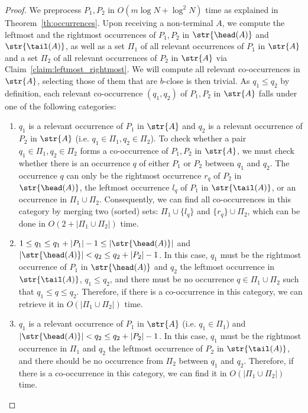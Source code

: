 \computingrelevant*
\begin{proof}
We preprocess $P_1, P_2$ in $O(m \log N + \log^2 N)$ time as explained in Theorem~\ref{th:occurrences}. Upon receiving a non-terminal $A$, we compute the leftmost and the rightmost occurrences of $P_1, P_2$ in $\str{\head(A)}$ and $\str{\tail(A)}$, as well as a set $\Pi_1$ of all relevant occurrences of $P_1$ in $\str{A}$ and a set $\Pi_2$ of all relevant occurrences of $P_2$ in $\str{A}$ via Claim~\ref{claim:leftmost_rightmost}.
We will compute all relevant co-occurrences in $\str{A}$, selecting those of them that are $b$-close is then trivial. 
As $q_1 \le q_2$ by definition, each relevant co-occurrence $(q_1,q_2)$ of $P_1,P_2$ in $\str{A}$ falls under one of the following categories:

\begin{enumerate}
\item $q_1$ is a relevant occurrence of $P_1$ in $\str{A}$ and $q_2$ is a relevant occurrence of $P_2$ in $\str{A}$ (i.e. $q_1 \in \Pi_1, q_2 \in \Pi_2$). To check whether a pair $q_1 \in \Pi_1, q_2 \in \Pi_2$ forms a co-occurrence of $P_1, P_2$ in $\str{A}$, we must check whether there is an occurrence $q$ of either $P_1$ or $P_2$ between $q_1$ and $q_2$. The occurrence $q$ can only be the rightmost occurrence $r_q$ of $P_2$ in $\str{\head(A)}$, the leftmost occurrence $l_q$ of $P_1$ in $\str{\tail(A)}$, or an occurrence in $\Pi_1 \cup \Pi_2$. Consequently, we can find all co-occurrences in this category by merging two (sorted) sets: $\Pi_1 \cup \{l_q\}$ and $\{r_q\} \cup \Pi_2$, which can be done in $O(2 + |\Pi_1 \cup \Pi_2|)$ time.

\item $1 \le q_1  \le q_1+|P_1|-1 \le |\str{\head(A)}|$ and  $|\str{\head(A)}| < q_2 \le q_2+|P_2|-1$. In this case, $q_1$ must be the rightmost occurrence of $P_1$ in $\str{\head(A)}$ and $q_2$ the leftmost occurrence in $\str{\tail(A)}$, $q_1 \le q_2$, and there must be no occurrence $q \in \Pi_1 \cup \Pi_2$  such that $q_1 \le q \le q_2$. Therefore, if there is a co-occurrence in this category, we can retrieve it in $O(|\Pi_1 \cup \Pi_2|)$ time.

\item $q_1$ is a relevant occurrence of $P_1$ in $\str{A}$ (i.e. $q_1 \in \Pi_1$) and $|\str{\head(A)}| < q_2 \le q_2+|P_2|-1$. In this case, $q_1$ must be the rightmost occurrence in $\Pi_1$ and $q_2$ the leftmost occurrence of $P_2$ in $\str{\tail(A)}$, and there should be no occurrence from $\Pi_2$ between $q_1$ and $q_2$. Therefore, if there is a co-occurrence in this category, we can find it in $O(|\Pi_1 \cup \Pi_2|)$ time.


\end{enumerate}
\end{proof}

